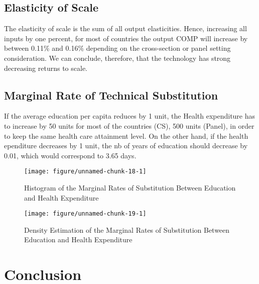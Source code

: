 \documentclass[12pt,a4paper]{article}\usepackage[]{graphicx}\usepackage[]{color}
\makeatletter
\def\maxwidth{ %
  \ifdim\Gin@nat@width>\linewidth
    \linewidth
  \else
    \Gin@nat@width
  \fi
}
\newenvironment{knitrout}{}{} %
\makeatother
\begin{document}
\subsection{Elasticity of Scale}


The elasticity of scale is the sum of all output elasticities. Hence, increasing all  inputs by one percent, for most of countries
the output COMP will increase by between 0.11\% and 0.16\% depending on the cross-section or panel setting consideration.
We can conclude, therefore, that the technology has strong decreasing returns to scale.

\subsection{Marginal Rate of Technical Substitution}
If the average education per capita reduces by 1 unit, the Health expenditure has to increase by 50 units for most of the countries (CS), 500 units (Panel), in order to keep the same health care attainment level.
On the other hand, if the health ependiture decreases by 1 unit, the nb of years of education should decrease by 0.01, which would correspond to 3.65 days.

\begin{knitrout}
\color{fgcolor}\begin{figure}
\texttt{[image: figure/unnamed-chunk-18-1]} \caption[Histogram of the Marginal Rates of Substitution Between Education and Health Expenditure]{Histogram of the Marginal Rates of Substitution Between Education and Health Expenditure}\label{fig:unnamed-chunk-18}
\end{figure}


\end{knitrout}
\begin{knitrout}
\color{fgcolor}\begin{figure}
\texttt{[image: figure/unnamed-chunk-19-1]} \caption[Density Estimation of the Marginal Rates of Substitution Between Education and Health Expenditure]{Density Estimation of the Marginal Rates of Substitution Between Education and Health Expenditure}\label{fig:unnamed-chunk-19}
\end{figure}


\end{knitrout}

\section{Conclusion}
\end{document}
